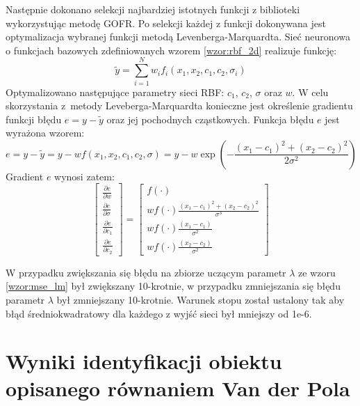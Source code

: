 Następnie dokonano selekcji najbardziej istotnych funkcji z biblioteki wykorzystując metodę GOFR. Po selekcji każdej z funkcji dokonywana jest optymalizacja wybranej funkcji metodą Levenberga-Marquardta. Sieć neuronowa o funkcjach bazowych zdefiniowanych wzorem \ref{wzor:rbf_2d} realizuje funkcję:
\begin{equation}
	\tilde{y} = \sum_{i=1}^N w_i f_i(x_1,x_2,c_1,c_2,\sigma_i)
\end{equation}
Optymalizowano następujące parametry sieci RBF: $c_1$, $c_2$, $\sigma$ oraz $w$. W celu skorzystania z~metody Leveberga-Marquardta konieczne jest określenie gradientu funkcji błędu $e = y - \tilde{y}$ oraz jej pochodnych cząstkowych. Funkcja błędu $e$ jest wyrażona wzorem:
\begin{equation}
	e = y - \tilde{y} = y - w f(x_1,x_2,c_1,c_2,\sigma) = y - w \exp(-\frac{(x_1-c_1)^2 + (x_2-c_2)^2}{2 \sigma^2}) 
\end{equation}
Gradient $e$ wynosi zatem:
\begin{equation}
\begin{bmatrix}
	\frac{\partial e}{\partial w} \\
	\frac{\partial e}{\partial \sigma} \\
	\frac{\partial e}{\partial c_1} \\
	\frac{\partial e}{\partial c_2}
\end{bmatrix} = 
\begin{bmatrix}
	f(\cdot) \\
	w f(\cdot) \frac{(x_1 - c_1)^2 + (x_2 - c_2)^2}{\sigma^3}\\
	w f(\cdot) \frac{(x_1 - c_1)}{\sigma^2}\\
	w f(\cdot) \frac{(x_2 - c_2)}{\sigma^2}	
\end{bmatrix}
\end{equation}

W przypadku zwiększania się błędu na zbiorze uczącym parametr $\lambda$ ze wzoru \ref{wzor:mse_lm} był zwiększany 10-krotnie, w przypadku zmniejszania się błędu parametr $\lambda$ był zmniejszany 10-krotnie. Warunek stopu został ustalony tak aby błąd średniokwadratowy dla każdego z wyjść sieci był mniejszy od 1e-6. 






\clearpage
\section{Wyniki identyfikacji obiektu opisanego równaniem Van der Pola}

